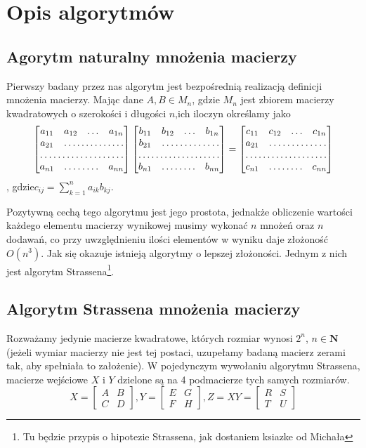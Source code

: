 \section{Opis algorytmów}
\subsection{Agorytm naturalny mnożenia macierzy}
Pierwszy badany przez nas algorytm jest bezpośrednią realizacją definicji mnożenia macierzy. Mając dane $A,B \in M_{n}$, gdzie $M_{n}$ jest zbiorem macierzy kwadratowych o szerokości i długości $n$,ich iloczyn określamy jako
$$ \begin{bmatrix}
a_{11} & a_{12} & \ldots & a_{1n} \\
a_{21} & \hdotsfor{3} \\
\hdotsfor{4}\\
a_{n1} & \hdotsfor{2} & a_{nn} \end{bmatrix}
\begin{bmatrix}
b_{11} & b_{12} & \ldots & b_{1n} \\
b_{21} & \hdotsfor{3} \\
\hdotsfor{4}\\
b_{n1} & \hdotsfor{2} & b_{nn} \end{bmatrix}=
\begin{bmatrix}
c_{11} & c_{12} & \ldots & c_{1n} \\
a_{21} & \hdotsfor{3} \\
\hdotsfor{4}\\
c_{n1} & \hdotsfor{2} & c_{nn} \end{bmatrix}
$$,
gdzie$c_{ij}=\sum_{k=1}^{n} a_{ik}b_{kj}$. 

Pozytywną cechą tego algorytmu jest jego prostota, jednakże obliczenie wartości każdego elementu macierzy wynikowej musimy wykonać $n$ mnożeń oraz $n$ dodawań, co przy uwzględnieniu ilości elementów w wyniku daje złożoność $O(n^3)$. Jak się okazuje istnieją algorytmy o lepszej złożoności. Jednym z nich jest algorytm Strassena\footnote{Tu będzie przypis o hipotezie Strassena, jak dostaniem ksiazke od Michała}.
\subsection{Algorytm Strassena mnożenia macierzy}
Rozważamy jedynie macierze kwadratowe, których rozmiar wynosi $2^n$, $n \in \mathbf{N}$ (jeżeli wymiar macierzy nie jest tej postaci, uzupełamy badaną macierz zerami tak, aby spełniała to założenie). W pojedynczym wywołaniu algorytmu Strassena, macierze wejściowe $X$ i $Y$ dzielone są na 4 podmacierze tych samych rozmiarów.
$$X=\begin{bmatrix} A & B \\ C & D \end{bmatrix},	
Y=\begin{bmatrix} E & G \\ F & H \end{bmatrix},		
Z=XY=\begin{bmatrix} R & S \\ T & U \end{bmatrix}$$
